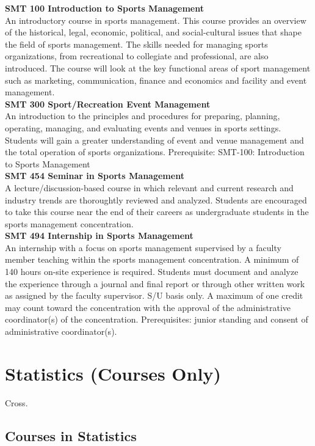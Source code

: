 \documentclass[
  letterpaper,
]{scrbook}
\begin{document}
\textbf{SMT 100 Introduction to Sports Management}\\
An introductory course in sports management. This course provides an
overview of the historical, legal, economic, political, and
social-cultural issues that shape the field of sports management. The
skills needed for managing sports organizations, from recreational to
collegiate and professional, are also introduced. The course will look
at the key functional areas of sport management such as marketing,
communication, finance and economics and facility and event
management.\\
\textbf{SMT 300 Sport/Recreation Event Management}\\
An introduction to the principles and procedures for preparing,
planning, operating, managing, and evaluating events and venues in
sports settings. Students will gain a greater understanding of event and
venue management and the total operation of sports organizations.
Prerequisite: SMT-100: Introduction to Sports Management\\
\textbf{SMT 454 Seminar in Sports Management}\\
A lecture/discussion-based course in which relevant and current research
and industry trends are thoroughtly reviewed and analyzed. Students are
encouraged to take this course near the end of their careers as
undergraduate students in the sports management concentration.\\
\textbf{SMT 494 Internship in Sports Management}\\
An internship with a focus on sports management supervised by a faculty
member teaching within the sports management concentration. A minimum of
140 hours on-site experience is required. Students must document and
analyze the experience through a journal and final report or through
other written work as assigned by the faculty supervisor. S/U basis
only. A maximum of one credit may count toward the concentration with
the approval of the administrative coordinator(s) of the concentration.
Prerequisites: junior standing and consent of administrative
coordinator(s).

\section{Statistics (Courses Only)}\label{statistics-courses-only}

Cross.

\subsection{Courses in Statistics}\label{courses-in-statistics}
\end{document}
